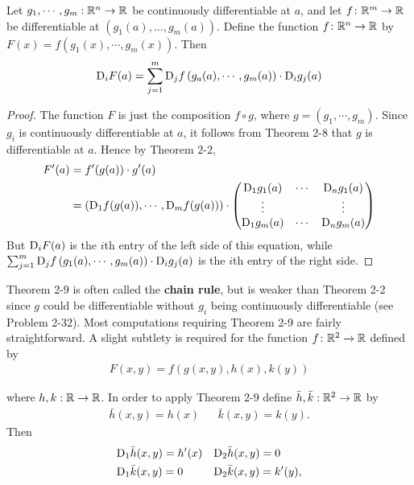 \begin{theorem}
    Let $g_1, \cdots, g_m:\mathbb{R}^n\to \mathbb{R}$ be continuously differentiable at $a$, and 
    let $f\colon{}\mathbb{R}^m\to \mathbb{R}$ be differentiable at $\left(g_1(a), \dots, g_m(a)\right)$. 
    Define the function $f\colon{}\mathbb{R}^n\to \mathbb{R}$ by $F(x) = f\left(g_1(x), \cdots, g_m(x)\right)$. Then 
    \begin{align*}
        \mathrm{D}_iF(a) = \sum_{j=1}^{m}{\mathrm{D}_jf\left(g_a(a), \cdots, g_m(a)\right)\cdot \mathrm{D}_ig_j(a)}
    \end{align*}
\end{theorem}

\begin{proof}
    The function $F$ is just the composition $f\circ g$, where $g = (g_1,\cdots,g_m)$.
    Since $g_i$ is continuously differentiable at $a$, it follows from Theorem 2-8 
    that $g$ is differentiable at $a$. Hence by Theorem 2-2,
    \begin{align*}
        F'(a) 
        & = f'(g(a)) \cdot g'(a) \\
        & = \left(\mathrm{D}_1f(g(a)), \cdots, \mathrm{D}_mf(g(a))\right)\cdot 
            \left(\begin{matrix}
                \mathrm{D}_1g_1(a) & \cdots & \mathrm{D}_ng_1(a) \\
                \vdots & & \vdots \\
                \mathrm{D}_1g_m(a) & \cdots & \mathrm{D}_ng_m(a)
            \end{matrix}\right)
    \end{align*}
    But $\mathrm{D}_iF(a)$ is the $i$th entry of the left side of this equation, while 
    $\sum_{j=1}^{m }{\mathrm{D}_jf\left(g_1(a), \cdots, g_m(a)\right)}\cdot \mathrm{D}_ig_j(a)$ is the $i$th 
    entry of the right side.
\end{proof}

Theorem 2-9 is often called the \textbf{chain rule}, but is weaker
than Theorem 2-2 since $g$ could be differentiable without $g_i$
being continuously differentiable (see Problem 2-32).
Most computations requiring Theorem 2-9 are fairly straightforward.
A slight subtlety is required for the function $f\colon{}\mathbb{R}^2\to \mathbb{R}$
defined by 
\begin{align*}
    F(x, y) = f\left(g(x, y), h(x), k(y)\right)
\end{align*}

where $h, k:\mathbb{R}\to \mathbb{R}$. In order to apply Theorem 2-9 define $\bar{h}, \bar{k}:\mathbb{R}^2\to \mathbb{R}$ by 
\begin{align*}
    \bar{h}(x, y) = h(x) & & \bar{k}(x, y) = k(y).
\end{align*}
Then 
\begin{align*}
    & \mathrm{D}_1\bar{h}(x, y) = h'(x) && \mathrm{D}_2\bar{h}(x, y) = 0 \\
    & \mathrm{D}_1\bar{k}(x, y) = 0 && \mathrm{D}_2\bar{k}(x, y) = k'(y),
\end{align*}


